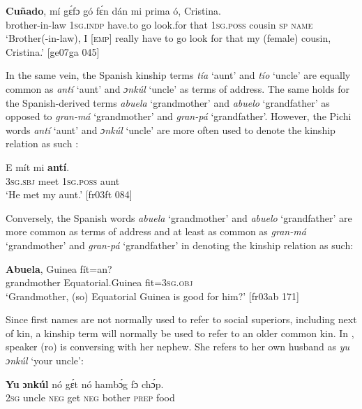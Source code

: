 \ea%
    \label{ex:key:1678}
    \gll \textbf{Cuñado},      mí    gɛ́fɔ    gó  fɛ́n    dán  mi    
prima  ó,  Cristina.\\
brother-in-law  \textsc{1sg.indp}  have.to  go  look.for  that  \textsc{1sg.poss}  
cousin  \textsc{sp}  \textsc{name}\\
\glt ‘Brother(-in-law), I [\textsc{emp}] really have to go look for that my (female) cousin, Cristina.’ [ge07ga 045]
\z

In the same vein, the Spanish kinship terms \textit{tía} ‘aunt’ and \textit{tío} ‘uncle’ are equally common as \textit{antí} ‘aunt’ and \textit{ɔnkúl} ‘uncle’ as terms of address. The same holds for the Spanish-derived terms \textit{abuela} ‘grandmother’ and \textit{abuelo} ‘grandfather’ as opposed to \textit{gran-má} ‘grandmother’ and \textit{gran-pá} ‘grandfather’. However, the Pichi words \textit{antí} ‘aunt’ and \textit{ɔnkúl} ‘uncle’ are more often used to denote the kinship relation as such : 


\ea%
    \label{ex:key:1679}
    \gll E    mít    mi    \textbf{antí}.\\
\textsc{3sg.sbj}  meet  \textsc{1sg.poss}  aunt\\

\glt ‘He met my aunt.’ [fr03ft 084]
\z

Conversely, the Spanish words \textit{abuela} ‘grandmother’ and \textit{abuelo} ‘grandfather’ are more common as terms of address and at least as common as \textit{gran-má} ‘grandmother’ and \textit{gran-pá} ‘grandfather’ in denoting the kinship relation as such:


\ea%
    \label{ex:key:1680}
    \gll \textbf{Abuela},    Guinea      fít=an?\\
grandmother  Equatorial.Guinea  fit=\textsc{3sg.obj}\\

\glt ‘Grandmother, (so) Equatorial Guinea is good for him?’ [fr03ab 171]
\z

Since first names are not normally used to refer to social superiors, including next of kin, a kinship term will normally be used to refer to an older common kin. In , speaker (ro) is conversing with her nephew. She refers to her own husband as \textit{yu ɔnkúl} ‘your uncle’: 


\ea%
    \label{ex:key:1681}
    \gll \textbf{Yu}  \textbf{ɔnkúl}  nó  gɛ́t  nó  hambɔ́g  fɔ  chɔ́p.\\
\textsc{2sg}  uncle  \textsc{neg}  get  \textsc{neg}  bother  \textsc{prep}  food\\

